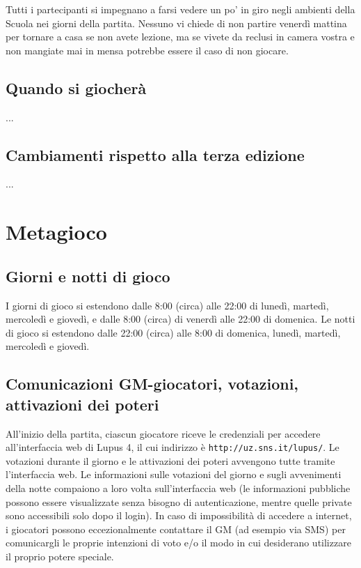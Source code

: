 \documentclass[a4paper,10pt]{article}
\begin{document}
Tutti i partecipanti si impegnano a farsi vedere un po' in giro negli ambienti della Scuola nei giorni della partita. Nessuno vi chiede di non partire venerdì mattina per tornare a casa se non avete lezione, ma se vivete da reclusi in camera vostra e non mangiate mai in mensa potrebbe essere il caso di non giocare.


\subsection{Quando si giocherà}

...


\subsection{Cambiamenti rispetto alla terza edizione}

...


\pagebreak
\section{Metagioco}

\subsection{Giorni e notti di gioco}

I giorni di gioco si estendono dalle 8:00 (circa) alle 22:00 di lunedì, martedì, mercoledì e giovedì, e dalle 8:00 (circa) di venerdì alle 22:00 di domenica.
Le notti di gioco si estendono dalle 22:00 (circa) alle 8:00 di domenica, lunedì, martedì, mercoledì e giovedì.



\subsection{Comunicazioni GM-giocatori, votazioni, attivazioni dei poteri}

All'inizio della partita, ciascun giocatore riceve le credenziali per accedere all'interfaccia web di Lupus 4, il cui indirizzo è \verb|http://uz.sns.it/lupus/|.
Le votazioni durante il giorno e le attivazioni dei poteri avvengono tutte tramite l'interfaccia web. Le informazioni sulle votazioni del giorno e sugli avvenimenti della notte compaiono a loro volta sull'interfaccia web (le informazioni pubbliche possono essere visualizzate senza bisogno di autenticazione, mentre quelle private sono accessibili solo dopo il login).
In caso di impossibilità di accedere a internet, i giocatori possono eccezionalmente contattare il GM (ad esempio via SMS) per comunicargli le proprie intenzioni di voto e/o il modo in cui desiderano utilizzare il proprio potere speciale.
\end{document}
